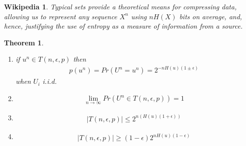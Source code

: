 \documentclass[twoside]{article}
\newtheorem{theorem}{Theorem}[section]
\newtheorem*{wikipedia}{Wikipedia}
\theoremstyle{definition} %
\begin{document}
\begin{wikipedia}
  Typical sets provide a theoretical means for compressing data, allowing us to represent any sequence $X^n$ using $nH(X)$ bits on average, and, hence, justifying the use of entropy as a measure of information from a source.
\end{wikipedia}

\begin{theorem}
  \begin{enumerate}
    \item if $u^n \in T(n, \epsilon, p)$ then
    \begin{align*}
      p(u^n) = Pr(U^n = u^n) = 2^{-n H(u)(1 \pm \epsilon)}
    \end{align*}
    when $U_i$ i.i.d.
    \item
    \begin{align*}
      \lim_{n \rightarrow \infty} Pr(U^n \in T(n, \epsilon, p)) = 1
    \end{align*}
    \item
    \begin{align*}
      |T(n, \epsilon, p)| \leq 2^{n (H(u)(1 + \epsilon))}
    \end{align*}
    \item
    \begin{align*}
      |T(n, \epsilon, p)| \geq (1-\epsilon) 2^{n H(u)(1-\epsilon)}
    \end{align*}
  \end{enumerate}
\end{theorem}
\end{document}
